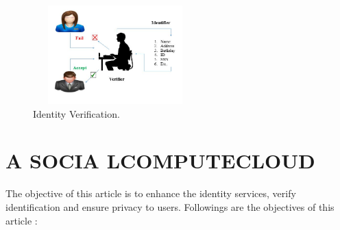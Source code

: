 \documentclass[a4paper,12pt]{article}
\begin{document}
            \begin{figure}[htp]
                \begin{center}
                    \includegraphics[height=1.5in,width=2.5in]{jpg/main.jpg}
                \end{center}
                \caption{Identity Verification.} \label{Fig:1}
            \end{figure}

    \newpage
    \section{A SOCIA LCOMPUTECLOUD}
        The objective of this article is to enhance the identity services, verify identification and ensure privacy to users.
        Followings are the objectives of this article :
\end{document}
